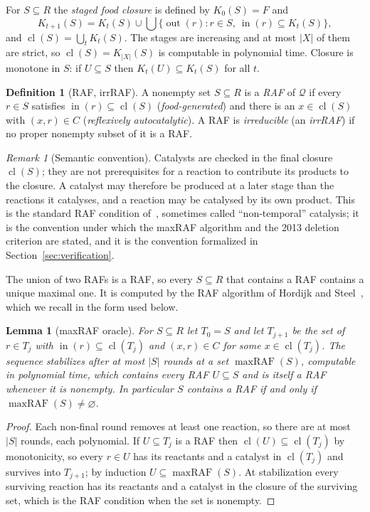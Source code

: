\documentclass[11pt,a4paper]{article}
\theoremstyle{plain}
\newtheorem{lemma}[theorem]{Lemma}
\theoremstyle{definition}
\newtheorem{definition}[theorem]{Definition}
\theoremstyle{remark}
\newtheorem{remark}[theorem]{Remark}
\newcommand{\cl}{\operatorname{cl}}
\newcommand{\maxRAF}{\operatorname{maxRAF}}
\newcommand{\inn}{\operatorname{in}}
\newcommand{\out}{\operatorname{out}}
\newcommand{\cQ}{\mathcal{Q}}
\begin{document}
For $S\subseteq R$ the \emph{staged food closure} is defined by $K_0(S)=F$ and
\[
K_{t+1}(S)=K_t(S)\cup\bigcup\{\out(r): r\in S,\ \inn(r)\subseteq K_t(S)\},
\]
and $\cl(S)=\bigcup_t K_t(S)$. The stages are increasing and at most $|X|$ of them are strict, so $\cl(S)=K_{|X|}(S)$ is computable in polynomial time. Closure is monotone in $S$: if $U\subseteq S$ then $K_t(U)\subseteq K_t(S)$ for all $t$.

\begin{definition}[RAF, irrRAF]\label{def:raf}
A nonempty set $S\subseteq R$ is a \emph{RAF} of $\cQ$ if every $r\in S$ satisfies $\inn(r)\subseteq\cl(S)$ (\emph{food-generated}) and there is an $x\in\cl(S)$ with $(x,r)\in C$ (\emph{reflexively autocatalytic}). A RAF is \emph{irreducible} (an \emph{irrRAF}) if no proper nonempty subset of it is a RAF.
\end{definition}

\begin{remark}[Semantic convention]\label{rem:semantics}
Catalysts are checked in the final closure $\cl(S)$; they are not prerequisites for a reaction to contribute its products to the closure. A catalyst may therefore be produced at a later stage than the reactions it catalyses, and a reaction may be catalysed by its own product. This is the standard RAF condition of~\cite{hordijk2004detecting,steel2013minimal}, sometimes called ``non-temporal'' catalysis; it is the convention under which the maxRAF algorithm and the 2013 deletion criterion are stated, and it is the convention formalized in Section~\ref{sec:verification}.
\end{remark}

The union of two RAFs is a RAF, so every $S\subseteq R$ that contains a RAF contains a unique maximal one. It is computed by the RAF algorithm of Hordijk and Steel~\cite{hordijk2004detecting}, which we recall in the form used below.

\begin{lemma}[maxRAF oracle]\label{lem:maxraf}
For $S\subseteq R$ let $T_0=S$ and let $T_{j+1}$ be the set of $r\in T_j$ with $\inn(r)\subseteq\cl(T_j)$ and $(x,r)\in C$ for some $x\in\cl(T_j)$. The sequence stabilizes after at most $|S|$ rounds at a set $\maxRAF(S)$, computable in polynomial time, which contains every RAF $U\subseteq S$ and is itself a RAF whenever it is nonempty. In particular $S$ contains a RAF if and only if $\maxRAF(S)\neq\varnothing$.
\end{lemma}

\begin{proof}
Each non-final round removes at least one reaction, so there are at most $|S|$ rounds, each polynomial. If $U\subseteq T_j$ is a RAF then $\cl(U)\subseteq\cl(T_j)$ by monotonicity, so every $r\in U$ has its reactants and a catalyst in $\cl(T_j)$ and survives into $T_{j+1}$; by induction $U\subseteq\maxRAF(S)$. At stabilization every surviving reaction has its reactants and a catalyst in the closure of the surviving set, which is the RAF condition when the set is nonempty.
\end{proof}
\end{document}
